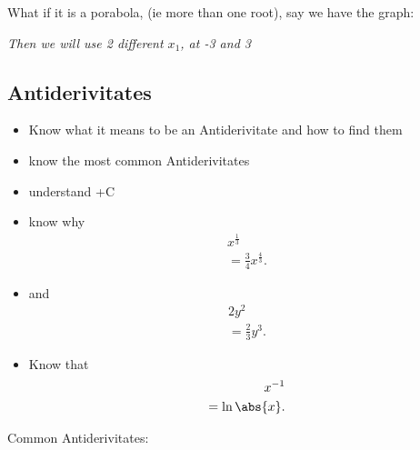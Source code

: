 \documentclass{report}
\begin{document}
    \bigbreak \noindent \bigbreak \noindent 
    What if it is a porabola, (ie more than one root), say we have the graph:
\begin{figure}[ht]
    \centering
    \label{fig:porab}
\end{figure}
    \bigbreak \noindent 
    \textit{Then we will use 2 different $x_1$, at -3 and 3}

    \bigbreak \noindent \bigbreak \noindent 
    \subsection{Antiderivitates}
    \begin{itemize}
      \item Know what it means to be an Antiderivitate and how to find them
      \item know the most common Antiderivitates
      \item understand +C
      \item know why 
        \begin{align*}
          x^{\frac{1}{3}} \\ 
          = \frac{3}{4}x^{\frac{4}{3}}
        .\end{align*}
      \item and 
        \begin{align*}
          2y^{2} \\
          = \frac{2}{3}y^{3}
        .\end{align*}
      \item Know that \begin{align*}
        x^{-1} \\
        = \ln{\abs{x}}
      .\end{align*}
    \end{itemize}
     \bigbreak \noindent \bigbreak \noindent
     Common Antiderivitates:
     \bigbreak \noindent 
\end{document}
